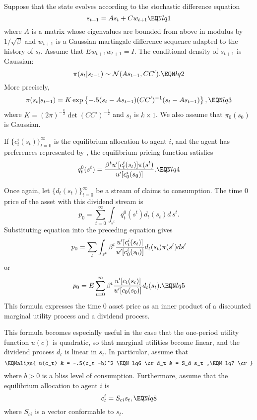   Suppose that the state evolves   according to the stochastic
difference equation
$$ s_{t+1} = A s_t + C w_{t+1}   \EQN lq1 $$
where $A$ is a matrix whose eigenvalues are bounded from
above in modulus by $1 /  \sqrt {\beta}$ and
$w_{t+1}$ is a Gaussian martingale difference sequence adapted to
the history of $s_t$.  Assume that $E w_{t+1} w_{t+1} = I$.
The conditional density of $s_{t+1}$  is Gaussian:
$$ \pi(s_t \vert s_{t-1}) \sim {\cal N}(As_{t-1}, CC'). \EQN lq2$$
More precisely,
$$ \pi(s_t \vert s_{t-1}) = K \exp \left\{ -.5 (s_t - As_{t-1} )
         (C C')^{-1} (s_t - A s_{t-1} ) \right\} , \EQN lq3 $$
where $K = (2 \pi)^{-{\frac k 2}} \det (CC')^{-{\frac 1 2}}$ and $s_t$
is  $k \times 1$.   We also assume that $\pi_0(s_0)$ is
Gaussian.




  If $\{c_t^i(s_t)\}_{t=0}^\infty$ is the equilibrium allocation to
agent $i$, and the agent has preferences  represented by
, the equilibrium
pricing function satisfies
$$  q_t^0(s^t)= {\beta^t u'[c_t^i(s_t)] \pi(s^t) \over u'[c_0^i(s_0)]}
     .\EQN lq4 $$






Once again, let $\{d_t(s_t)\}_{t=0}^\infty$
 be a stream of claims to consumption.
The time $0$ price of the asset with this dividend stream is
$$ p_0  = \sum_{t=0}^\infty \int_{s^t} q_t^0(s^t) d_t(s_t) d \, s^t .$$
Substituting equation  into the preceding equation gives
$$ p_0 =  \sum_t \int_{s^t} \beta^t { u'[c_t^i(s_t)]
  \over u'[c_0^i(s_0)]} d_t(s_t) \pi(s^t)
  d s^t $$
or
$$ p_0 = E \sum_{t=0}^\infty \beta^t { u'[c_t(s_t)]
     \over u'[c_0(s_0)]} d_t(s_t) .\EQN lq5$$
This formula expresses the time $0$ asset price as
an inner product of a discounted marginal utility process and a dividend
 process.




  This formula becomes especially useful in the case that
the one-period utility function $u(c)$ is quadratic, so that
marginal utilities become linear, and  the dividend process
$d_t$ is linear in $s_t$.  In particular,
assume that
$$ \EQNalign{ u(c_t) & = -.5(c_t -b)^2 \EQN lq6 \cr
              d_t & = S_d s_t ,\EQN lq7 \cr}$$
where $b >0$ is a bliss level of consumption.
Furthermore, assume that the equilibrium allocation to
agent $i$ is
$$ c_t^i = S_{ci} s_t, \EQN lq8 $$
where $S_{ci}$ is a vector conformable to $s_t$.




